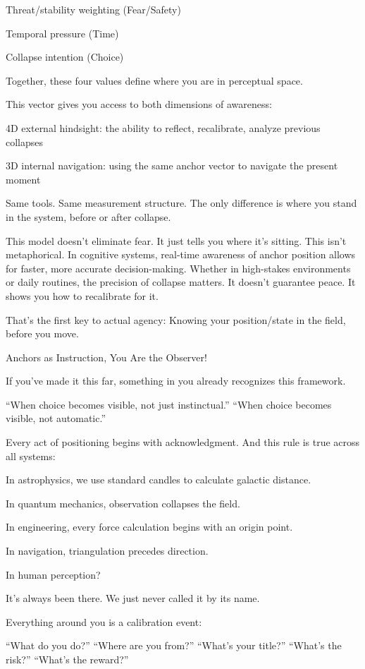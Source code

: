 \documentclass[11pt]{article}
\begin{document}
Threat/stability weighting (Fear/Safety)

Temporal pressure (Time)

Collapse intention (Choice)

Together, these four values define where you are in perceptual space.

This vector gives you access to both dimensions of awareness:

4D external hindsight: the ability to reflect, recalibrate, analyze previous collapses

3D internal navigation: using the same anchor vector to navigate the present moment

Same tools.
Same measurement structure.
The only difference is where you stand in the system, before or after collapse.

This model doesn’t eliminate fear. It just tells you where it’s sitting. This isn’t metaphorical. In cognitive systems, real-time awareness of anchor position allows for faster, more accurate decision-making. Whether in high-stakes environments or daily routines, the precision of collapse matters. It doesn’t guarantee peace. It shows you how to recalibrate for it.

That’s the first key to actual agency:
Knowing your position/state in the field, before you move. 

Anchors as Instruction, You Are the Observer!

If you’ve made it this far, something in you already recognizes this framework.

“When choice becomes visible, not just instinctual.” 
“When choice becomes visible, not automatic.”

Every act of positioning begins with acknowledgment. And this rule is true across all systems:

In astrophysics, we use standard candles to calculate galactic distance.

In quantum mechanics, observation collapses the field.

In engineering, every force calculation begins with an origin point.

In navigation, triangulation precedes direction.

In human perception?

It’s always been there.
We just never called it by its name.

Everything around you is a calibration event:

“What do you do?”
“Where are you from?”
“What’s your title?”
“What’s the risk?”
“What’s the reward?”
\end{document}
